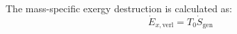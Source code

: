 The mass-specific exergy destruction is calculated as:  
\[
\dot{E}_{x,\text{verl}} = T_0 \dot{S}_{\text{gen}}
\]